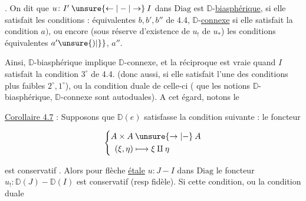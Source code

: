 \uline{} . On dit que $u\colon I'\mathbin{\unsure{\leftarrow|-|\to}}I$ dans $\mathrm{Diag}$ est $\mathbb{D}$-\uline{biasphérique},  si elle satisfait les conditions : équivalentes $b,b',b''$ de 4.4, $\mathbb{D}$-\uline{connexe} si elle satisfait la condition $a)$, ou encore (sous réserve d'existence de $u_!$  de $u_*$) les conditions équivalentes $a'\unsure{)|\}}$, $a''$.

Ainsi, $\mathbb{D}$-biasphérique implique $\mathbb{D}$-connexe, et la réciproque est vraie quand $I$ satisfait  la condition $3^\circ$ de 4.4. (donc aussi, si elle satisfait l'une des conditions plus faibles $2^\circ,1^\circ$), ou la condition duale de celle-ci ( que les notions $\mathbb{D}$-biasphérique, $\mathbb{D}$-connexe sont autoduales). A cet égard, notons le

\uline{Corollaire 4.7} : Supposons que $\mathbb{D}(e)$ satisfasse la condition suivante : le foncteur


\[
 \left\{\begin{aligned}
 A\times A&\mathbin{\unsure{\to|-}}A\\
 (\xi,\eta)&\longmapsto \xi\amalg\eta
 \end{aligned}\right.
\]

est conservatif . Alors pour  flèche \uline{étale} $u\colon J\mathbin{-}I$ dans $\mathrm{Diag}$  le foncteur $u_!\colon\mathbb{D}(J)\mathbin{-}\mathbb{D}(I)$ est conservatif (resp fidèle). Si cette condition, ou la condition duale
